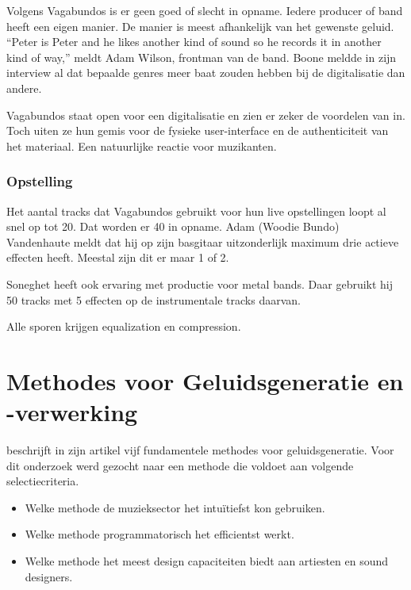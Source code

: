 Volgens Vagabundos is er geen goed of slecht in opname. Iedere producer of band heeft een eigen manier. De manier is meest afhankelijk van het gewenste geluid. ``Peter is Peter and he likes another kind of sound so he records it in another kind of way,'' meldt Adam Wilson, frontman van de band. \autocite{vagabundos} Boone meldde in zijn interview al dat bepaalde genres meer baat zouden hebben bij de digitalisatie dan andere.  \autocite{peterboone}

Vagabundos staat open voor een digitalisatie en zien er zeker de voordelen van in. Toch uiten ze hun gemis voor de fysieke user-interface en de authenticiteit van het materiaal. Een natuurlijke reactie voor muzikanten. \autocite{vagabundos}

\subsubsection*{Opstelling}

Het aantal tracks dat Vagabundos gebruikt voor hun live opstellingen loopt al snel op tot 20. Dat worden er 40 in opname. Adam (Woodie Bundo) Vandenhaute meldt dat hij op zijn basgitaar uitzonderlijk maximum drie actieve effecten heeft. Meestal zijn dit er maar 1 of 2. \autocite{vagabundos}

Soneghet heeft ook ervaring met productie voor metal bands. Daar gebruikt hij 50 tracks met 5 effecten op de instrumentale tracks daarvan. \autocite{vagabundos}

Alle sporen krijgen equalization en compression. \autocite{vagabundos}

\section{Methodes voor Geluidsgeneratie en -verwerking}

\textcite{methodes} beschrijft in zijn artikel vijf fundamentele methodes voor geluidsgeneratie. Voor dit onderzoek werd gezocht naar een methode die voldoet aan volgende selectiecriteria.

\begin{itemize}
    \item Welke methode de muzieksector het intuïtiefst kon gebruiken.
    \item Welke methode programmatorisch het efficientst werkt.
    \item Welke methode het meest design capaciteiten biedt aan artiesten en sound designers.
\end{itemize}{}

